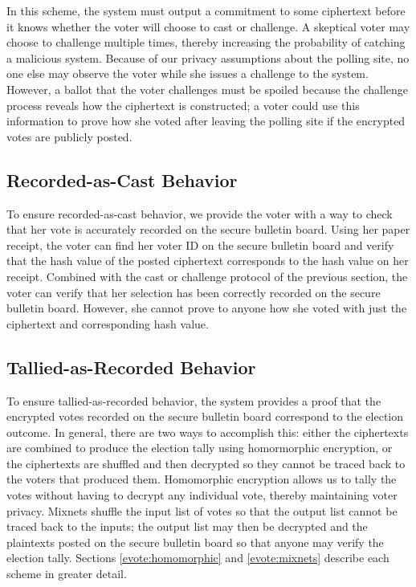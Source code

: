 In this scheme, the system must output a commitment to some ciphertext before it knows whether the voter will choose to cast or challenge. A skeptical voter may choose to challenge multiple times, thereby increasing the probability of catching a malicious system. Because of our privacy assumptions about the polling site, no one else may observe the voter while she issues a challenge to the system. However, a ballot that the voter challenges must be spoiled because the challenge process reveals how the ciphertext is constructed; a voter could use this information to prove how she voted after leaving the polling site if the encrypted votes are publicly posted.

\subsection{Recorded-as-Cast Behavior} \label{evote:design:recordedascast}

To ensure recorded-as-cast behavior, we provide the voter with a way to check that her vote is accurately recorded on the secure bulletin board. Using her paper receipt, the voter can find her voter ID on the secure bulletin board and verify that the hash value of the posted ciphertext corresponds to the hash value on her receipt. Combined with the cast or challenge protocol of the previous section, the voter can verify that her selection has been correctly recorded on the secure bulletin board. However, she cannot prove to anyone how she voted with just the ciphertext and corresponding hash value.

\subsection{Tallied-as-Recorded Behavior} \label{evote:design:talliedasrecorded}

To ensure tallied-as-recorded behavior, the system provides a proof that the encrypted votes recorded on the secure bulletin board correspond to the election outcome. In general, there are two ways to accomplish this: either the ciphertexts are combined to produce the election tally using homormorphic encryption, or the ciphertexts are shuffled and then decrypted so they cannot be traced back to the voters that produced them. Homomorphic encryption allows us to tally the votes without having to decrypt any individual vote, thereby maintaining voter privacy. Mixnets shuffle the input list of votes so that the output list cannot be traced back to the inputs; the output list may then be decrypted and the plaintexts posted on the secure bulletin board so that anyone may verify the election tally. Sections \ref{evote:homomorphic} and \ref{evote:mixnets} describe each scheme in greater detail.


